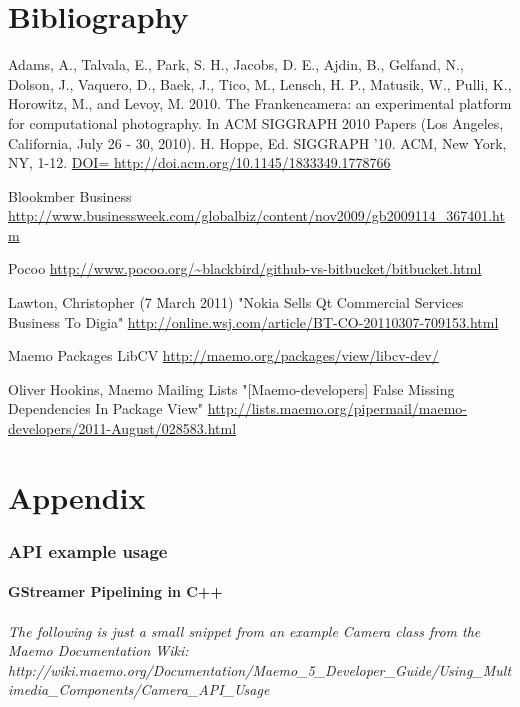 \documentclass[11pt]{article} %
\begin{document}
\part{Bibliography}
\begin{thebibliography}{9}

 Adams, A., Talvala, E., Park, S. H., Jacobs, D. E., Ajdin, B., Gelfand, N., Dolson, J., Vaquero, D., Baek, J., Tico, M., Lensch, H. P., Matusik, W., Pulli, K., Horowitz, M., and Levoy, M.
2010. The Frankencamera: an experimental platform for computational photography.
In ACM SIGGRAPH 2010 Papers (Los Angeles, California, July 26 - 30, 2010).
H. Hoppe, Ed. SIGGRAPH '10. ACM, New York, NY, 1-12.
\url{DOI= http://doi.acm.org/10.1145/1833349.1778766}

 Blookmber Business
\url{http://www.businessweek.com/globalbiz/content/nov2009/gb2009114_367401.htm}

 Pocoo
\url{http://www.pocoo.org/~blackbird/github-vs-bitbucket/bitbucket.html}

 Lawton, Christopher (7 March 2011)
"Nokia Sells Qt Commercial Services Business To Digia"
\url{http://online.wsj.com/article/BT-CO-20110307-709153.html}

 Maemo Packages
LibCV
\url{http://maemo.org/packages/view/libcv-dev/}

 Oliver Hookins, Maemo Mailing Lists
"[Maemo-developers] False Missing Dependencies In Package View"
\url{http://lists.maemo.org/pipermail/maemo-developers/2011-August/028583.html}


\end{thebibliography}

\part{Appendix}
\section{API example usage}
\subsection{GStreamer Pipelining in C++}
\paragraph{ The following is just a small snippet from an example Camera class from the Maemo Documentation Wiki:
http://wiki.maemo.org/Documentation/Maemo\_5\_Developer\_Guide/Using\_Multimedia\_Components/Camera\_API\_Usage}

\end{document}
